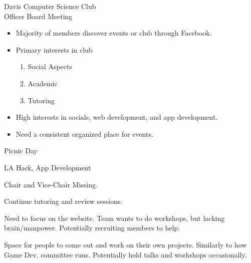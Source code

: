 \documentclass{article}
\begin{document}
\begin{Minutes}{Davis Computer Science Club\\Officer Board Meeting}

\begin{itemize}
	\item Majority of members discover events or club through Facebook.
	\item Primary interests in club
	\begin{enumerate}
		\item Social Aspects
		\item Academic
		\item Tutoring
	\end{enumerate}
	\item High interests in socials, web development, and app development.
	\item Need a consistent organized place for events.
\end{itemize}



Picnic Day


LA Hack, App Development


Chair and Vice-Chair Missing. 


Continue tutoring and review sessions.


Need to focus on the website. Team wants to do workshops, but lacking brain/manpower. Potentially recruiting members to help.


Space for people to come out and work on their own projects. Similarly to how Game Dev. committee runs. Potentially hold talks and workshops occasionally.



\end{Minutes}
\end{document}
